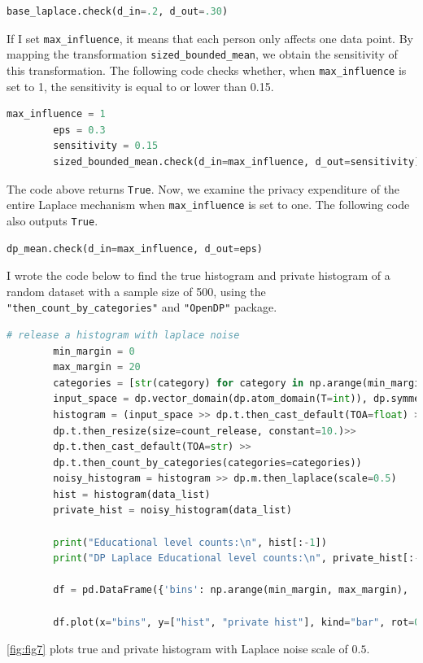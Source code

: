 \documentclass[12pt]{extarticle}
\begin{document}
	\begin{lstlisting}[language=Python]
		base_laplace.check(d_in=.2, d_out=.30) 				
	\end{lstlisting}
	If I set \texttt{max\_influence}, it means that each person only affects one data point. By mapping the transformation \texttt{sized\_bounded\_mean}, we obtain the sensitivity of this transformation. The following code checks whether, when \texttt{max\_influence} is set to 1, the sensitivity is equal to or lower than 0.15.
	\begin{lstlisting}[language=Python]
		max_influence = 1
		eps = 0.3
		sensitivity = 0.15
		sized_bounded_mean.check(d_in=max_influence, d_out=sensitivity) 				
	\end{lstlisting}
	The code above returns \texttt{True}. Now, we examine the privacy expenditure of the entire Laplace mechanism when \texttt{max\_influence} is set to one. The following code also outputs \texttt{True}.
	\begin{lstlisting}[language=Python]
		dp_mean.check(d_in=max_influence, d_out=eps) 				
	\end{lstlisting}
	 I wrote the code below to find the true histogram and private histogram of a random dataset with a sample size of 500, using the \texttt{"then\_count\_by\_categories"} and \texttt{"OpenDP"} package.
	 \begin{lstlisting}[language=Python]
	 	# release a histogram with laplace noise
	 	min_margin = 0
	 	max_margin = 20
	 	categories = [str(category) for category in np.arange(min_margin, max_margin)]
	 	input_space = dp.vector_domain(dp.atom_domain(T=int)), dp.symmetric_distance()
	 	histogram = (input_space >> dp.t.then_cast_default(TOA=float) >>
	 	dp.t.then_resize(size=count_release, constant=10.)>> 
	 	dp.t.then_cast_default(TOA=str) >>
	 	dp.t.then_count_by_categories(categories=categories))
	 	noisy_histogram = histogram >> dp.m.then_laplace(scale=0.5)
	 	hist = histogram(data_list)
	 	private_hist = noisy_histogram(data_list)
	 	
	 	print("Educational level counts:\n", hist[:-1])
	 	print("DP Laplace Educational level counts:\n", private_hist[:-1])
	 	
	 	df = pd.DataFrame({'bins': np.arange(min_margin, max_margin), 'hist': hist[:-1], 'private hist': private_hist[:-1]})
	 	
	 	df.plot(x="bins", y=["hist", "private hist"], kind="bar", rot=0)
	 \end{lstlisting}
	 \ref{fig:fig7} plots true and private histogram with Laplace noise scale of $0.5$.
	 
\end{document}
